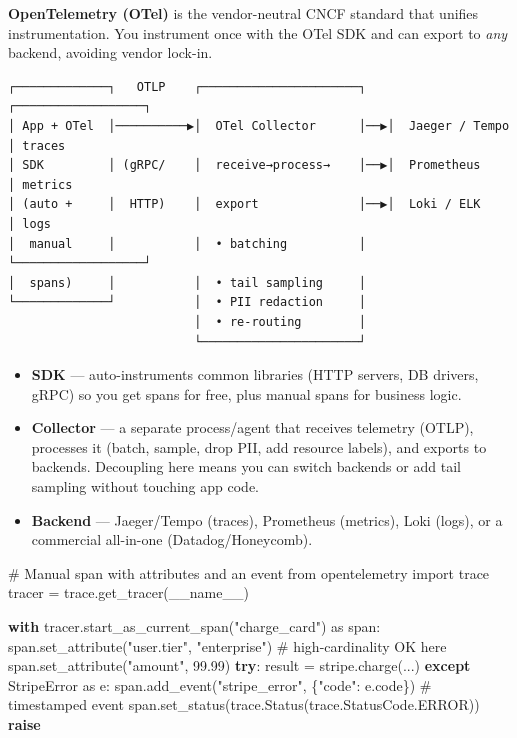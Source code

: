 \documentclass[11pt]{article}
\providecommand{\tightlist}{\setlength{\itemsep}{1pt}\setlength{\parskip}{0pt}}
\newenvironment{Shaded}{\begin{snugshade}}{\end{snugshade}}
\newcommand{\CommentTok}[1]{\textcolor[rgb]{0.48,0.49,0.49}{#1}}
\newcommand{\ControlFlowTok}[1]{\textcolor[rgb]{0.99,0.74,0.29}{\textbf{#1}}}
\newcommand{\FloatTok}[1]{\textcolor[rgb]{0.96,0.45,0.00}{#1}}
\newcommand{\ImportTok}[1]{\textcolor[rgb]{0.15,0.68,0.38}{#1}}
\newcommand{\NormalTok}[1]{\textcolor[rgb]{0.81,0.81,0.76}{#1}}
\newcommand{\OperatorTok}[1]{\textcolor[rgb]{0.81,0.81,0.76}{#1}}
\newcommand{\StringTok}[1]{\textcolor[rgb]{0.96,0.31,0.31}{#1}}
\newcommand{\VariableTok}[1]{\textcolor[rgb]{0.15,0.68,0.68}{#1}}
\begin{document}
\textbf{OpenTelemetry (OTel)} is the vendor-neutral CNCF standard that unifies instrumentation. You instrument once with the OTel SDK and can export to \emph{any} backend, avoiding vendor lock-in.

\setcodelang{}

\begin{verbatim}
┌─────────────┐   OTLP    ┌──────────────────────┐   ┌──────────────────┐
│ App + OTel  │──────────▶│  OTel Collector      │──▶│  Jaeger / Tempo  │ traces
│ SDK         │ (gRPC/    │  receive→process→    │──▶│  Prometheus      │ metrics
│ (auto +     │  HTTP)    │  export              │──▶│  Loki / ELK      │ logs
│  manual     │           │  • batching          │   └──────────────────┘
│  spans)     │           │  • tail sampling     │
└─────────────┘           │  • PII redaction     │
                          │  • re-routing        │
                          └──────────────────────┘
\end{verbatim}

\begin{itemize}
\tightlist
\item
  \textbf{SDK} --- auto-instruments common libraries (HTTP servers, DB drivers, gRPC) so you get spans for free, plus manual spans for business logic.
\item
  \textbf{Collector} --- a separate process/agent that receives telemetry (OTLP), processes it (batch, sample, drop PII, add resource labels), and exports to backends. Decoupling here means you can switch backends or add tail sampling without touching app code.
\item
  \textbf{Backend} --- Jaeger/Tempo (traces), Prometheus (metrics), Loki (logs), or a commercial all-in-one (Datadog/Honeycomb).
\end{itemize}


\begin{Shaded}
\begin{Highlighting}[]
\CommentTok{\# Manual span with attributes and an event}
\ImportTok{from}\NormalTok{ opentelemetry }\ImportTok{import}\NormalTok{ trace}
\NormalTok{tracer }\OperatorTok{=}\NormalTok{ trace.get\_tracer(}\VariableTok{\_\_name\_\_}\NormalTok{)}

\ControlFlowTok{with}\NormalTok{ tracer.start\_as\_current\_span(}\StringTok{"charge\_card"}\NormalTok{) }\ImportTok{as}\NormalTok{ span:}
\NormalTok{    span.set\_attribute(}\StringTok{"user.tier"}\NormalTok{, }\StringTok{"enterprise"}\NormalTok{)   }\CommentTok{\# high{-}cardinality OK here}
\NormalTok{    span.set\_attribute(}\StringTok{"amount"}\NormalTok{, }\FloatTok{99.99}\NormalTok{)}
    \ControlFlowTok{try}\NormalTok{:}
\NormalTok{        result }\OperatorTok{=}\NormalTok{ stripe.charge(...)}
    \ControlFlowTok{except}\NormalTok{ StripeError }\ImportTok{as}\NormalTok{ e:}
\NormalTok{        span.add\_event(}\StringTok{"stripe\_error"}\NormalTok{, \{}\StringTok{"code"}\NormalTok{: e.code\})  }\CommentTok{\# timestamped event}
\NormalTok{        span.set\_status(trace.Status(trace.StatusCode.ERROR))}
        \ControlFlowTok{raise}
\end{Highlighting}
\end{Shaded}
\end{document}
